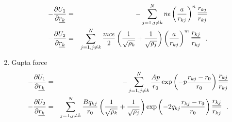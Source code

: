 \begin{enumerate}
\begin{eqnarray}
-\frac{\partial U_{1}}{\partial \mbox{$\underline{r_{k}}$}} &=& -\sum_{j=1,j \ne k}^{N} n \epsilon
\left( \frac{a}{r_{kj}} \right)^{n} \frac{\mbox{$\underline{r_{kj}}$}}{r_{kj}} \nonumber \\
-\frac{\partial U_{2}}{\partial \mbox{$\underline{r_{k}}$}} &=& \sum_{j=1,j \ne k}^{N} \frac{m c \epsilon}{2}
\left( {1 \over \sqrt{\rho_{k}}} + {1 \over \sqrt{\rho_{j}}} \right)
\left( \frac{a}{r_{kj}} \right)^{m} \frac{\mbox{$\underline{r_{kj}}$}}{r_{kj}}~~.
\end{eqnarray}
\item Gupta force
\begin{eqnarray}
-\frac{\partial U_{1}}{\partial \mbox{$\underline{r_{k}}$}} &=& -\sum_{j=1,j \ne k}^{N} \frac{A p}{r_{0}}
\exp \left( -p \frac{r_{kj}-r_{0}}{r_{0}} \right) \frac{\mbox{$\underline{r_{kj}}$}}{r_{kj}} \nonumber \\
-\frac{\partial U_{2}}{\partial \mbox{$\underline{r_{k}}$}} &=& \sum_{j=1,j \ne k}^{N} \frac{B q_{kj}}{r_{0}}
\left( {1 \over \sqrt{\rho_{k}}} + {1 \over \sqrt{\rho_{j}}} \right)
\exp \left( -2 q_{kj} \frac{r_{kj}-r_{0}}{r_{0}} \right) \frac{\mbox{$\underline{r_{kj}}$}}{r_{kj}}~~.
\end{eqnarray}
\end{enumerate}

